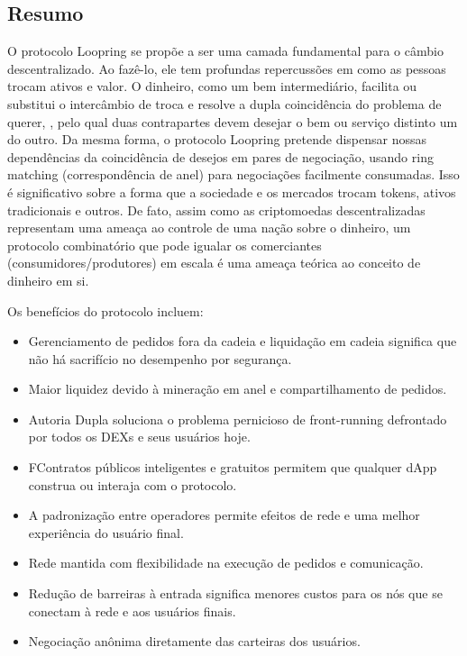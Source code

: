 \documentclass[UTF8,nofonts]{article}
\begin{document}
\begin{multicols}{2}
\section{Resumo}

O protocolo Loopring se propõe a ser uma camada fundamental para o câmbio descentralizado. Ao fazê-lo, ele tem profundas repercussões em como as pessoas trocam ativos e valor.
O dinheiro, como um bem intermediário, facilita ou substitui o intercâmbio de troca e resolve a dupla coincidência do problema de querer, \cite{unenumerated2006}, pelo qual duas contrapartes devem desejar o bem ou serviço distinto um do outro. Da mesma forma, o protocolo Loopring pretende dispensar nossas dependências da coincidência de desejos em pares de negociação, usando ring matching (correspondência de anel) para negociações facilmente consumadas. Isso é significativo sobre a forma que a sociedade e os mercados trocam tokens, ativos tradicionais e outros. De fato, assim como as criptomoedas descentralizadas representam uma ameaça ao controle de uma nação sobre o dinheiro, um protocolo combinatório que pode igualar os comerciantes (consumidores/produtores) em escala é uma ameaça teórica ao conceito de dinheiro em si.


Os benefícios do protocolo incluem:


\begin{itemize}

	\item Gerenciamento de pedidos fora da cadeia e liquidação em cadeia significa que não há sacrifício no desempenho por segurança.
	
	\item Maior liquidez devido à mineração em anel e compartilhamento de pedidos.
	\item Autoria Dupla soluciona o problema pernicioso de front-running defrontado por todos os DEXs e seus usuários hoje.
	\item FContratos públicos inteligentes e gratuitos permitem que qualquer dApp construa ou interaja com o protocolo.
	\item A padronização entre operadores permite efeitos de rede e uma melhor experiência do usuário final.
	\item Rede mantida com flexibilidade na execução de pedidos e comunicação.
	\item Redução de barreiras à entrada significa menores custos para os nós que se conectam à rede e aos usuários finais.
	\item Negociação anônima diretamente das carteiras dos usuários.


\end{itemize}
\end{multicols}
\end{document}
